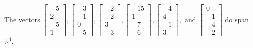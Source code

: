 \begin{exercise}
\begin{exerciseStatement}
  \end{exerciseStatement}
  \begin{exerciseAnswer}
   The vectors \(\left[\begin{array}{r}
-5 \\
2 \\
-5 \\
1
\end{array}\right] , \left[\begin{array}{r}
-3 \\
-1 \\
0 \\
-5
\end{array}\right] , \left[\begin{array}{r}
-2 \\
-2 \\
3 \\
-3
\end{array}\right] , \left[\begin{array}{r}
-15 \\
1 \\
-7 \\
-6
\end{array}\right] , \left[\begin{array}{r}
-4 \\
4 \\
-1 \\
3
\end{array}\right] , \text{ and } \left[\begin{array}{r}
0 \\
-1 \\
-4 \\
-2
\end{array}\right]\) 
  	 do  
	span \(\mathbb{R}^4\).
  


  \end{exerciseAnswer}
\end{exercise}